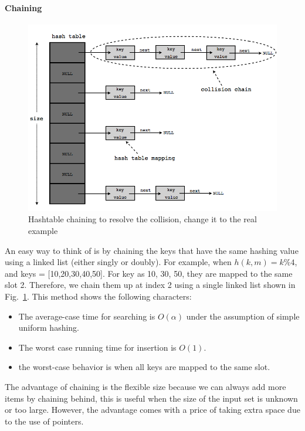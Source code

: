 \documentclass[../main.tex]{subfiles}
\begin{document}
\paragraph{Chaining}
\begin{figure}[ht!]
    \centering
    \includegraphics[width = 0.6\columnwidth]{fig/hashtable_chaining.png}
    \caption{Hashtable chaining to resolve the collision, change it to the real example}
    \label{fig:chaining}
\end{figure}
An easy way to think of is by chaining the keys that have the same hashing value using a linked list (either singly or doubly). For example, when $h(k, m)= k\%4$, and keys = [10,20,30,40,50]. For key as 10, 30, 50, they are mapped to the same slot 2. Therefore, we chain them up at index 2 using a single linked list shown in Fig.~\ref{fig:chaining}.  This method shows the following characters:
\begin{itemize}
    \item The average-case time for searching is $O(\alpha)$ under the assumption of simple uniform hashing. 
    \item The worst case running time for insertion is $O(1)$.
    \item the worst-case behavior is when all keys are mapped to the same slot. 
\end{itemize}


The advantage of chaining is the flexible size because we can always add more items by chaining behind, this is useful when the size of the input set is unknown or too large. However, the advantage comes with a price of taking extra space due to  the use of pointers.
\end{document}
